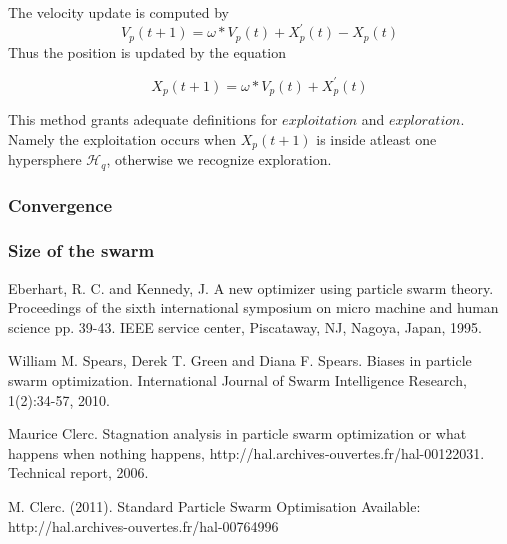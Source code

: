 \documentclass[runningheads,a4paper]{llncs}
\begin{document}
The velocity update is computed by
\begin{equation}
	V_p(t+1) = \omega * V_p(t) + X^{'}_p(t) - X_p(t)
\end{equation}
Thus the position is updated by the equation

\begin{equation}
	X_p(t+1) = \omega * V_p(t) + X^{'}_p(t)
\end{equation}

This method grants adequate definitions for $exploitation$ and $exploration$. Namely the exploitation occurs when $X_p(t+1)$ is inside atleast one hypersphere $\mathcal{H}_q$, otherwise we recognize exploration.

\subsubsection{Convergence}


\subsubsection{Size of the swarm}



\begin{thebibliography}{9}

Eberhart, R. C. and Kennedy, J. A new optimizer using particle swarm theory. Proceedings of the sixth international symposium on micro machine and human science pp. 39-43. IEEE service center, Piscataway, NJ, Nagoya, Japan, 1995.

William M. Spears, Derek T. Green and Diana F. Spears. Biases in particle swarm optimization. International Journal of Swarm Intelligence Research, 1(2):34-57, 2010.

Maurice Clerc. Stagnation analysis in particle swarm optimization or what happens when nothing happens, http://hal.archives-ouvertes.fr/hal-00122031. Technical report, 2006.

M. Clerc. (2011). Standard Particle Swarm Optimisation Available: http://hal.archives-ouvertes.fr/hal-00764996 

\end{thebibliography}
\end{document}
